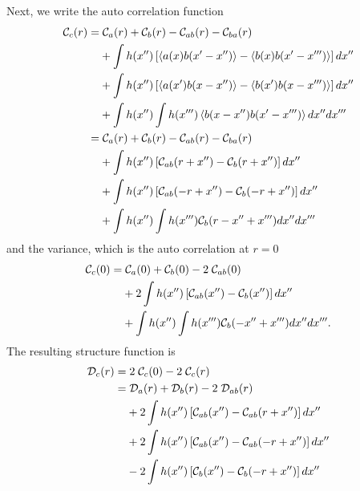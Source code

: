 \documentclass[11pt, oneside]{article}   	%
\begin{document}
\begin{appendix}
Next, we write the auto correlation function
\begin{align}
{\cal C}_c (r) =&\; {\cal C}_a (r) + {\cal C}_b (r) - {\cal C}_{a b}(r) - {\cal C}_{b a}(r) \nonumber \\
                       &+ \int h(x'') \left[\left< a(x) b(x'-x'')\right> - \left< b(x) b(x'-x''')\right> \right]dx'' \nonumber \\
                       &+ \int h(x'') \left[\left< a(x') b(x-x'')\right> - \left< b(x') b(x-x''')\right> \right]dx'' \nonumber \\
                       &+ \int h(x'') \int h(x''') \left< b(x-x'') b(x'-x''')\right> dx'' dx''' \nonumber \\
                      =&\;{\cal C}_a (r) + {\cal C}_b (r) - {\cal C}_{a b}(r) - {\cal C}_{ba}(r) \nonumber \\
                       &+\int h(x'') \left[ {\cal C}_{ab} (r+x'') - {\cal C}_b(r+x'') \right] dx'' \nonumber \\
                       &+\int h(x'') \left[ {\cal C}_{ab} (-r+x'') - {\cal C}_b(-r+x'') \right] dx'' \nonumber \\
                       &+\int h(x'') \int h(x''') {\cal C}_b(r-x''+x''') dx'' dx'''
\end{align}
and the variance, which is the auto correlation at $r=0$
\begin{align}
{\cal C}_c(0) = &\; {\cal C}_a(0) + {\cal C}_b (0) - 2\; {\cal C}_{a b}(0) \nonumber \\
                       &+2\int h(x'') \left[ {\cal C}_{ab} (x'') - {\cal C}_b(x'') \right] dx'' \nonumber \\
                       &+\int h(x'') \int h(x''') {\cal C}_b(-x''+x''') dx'' dx'''.
\end{align}
The resulting structure function is
\begin{align}
\label{eqn:67}
{\cal D}_c(r) =& \; 2\; {\cal C}_c (0) - 2\; {\cal C}_c(r) \nonumber \\
                     =&\; {\cal D}_a(r) + {\cal D}_b (r) - 2\; {\cal D}_{ab} (r) \nonumber \\
                       & + 2 \int h(x'') \left[ {\cal C}_{ab}(x'') - {\cal C}_{ab}(r+x'')\right] dx'' \nonumber \\
                       & + 2 \int h(x'') \left[ {\cal C}_{ab}(x'') - {\cal C}_{ab}(-r+x'')\right] dx'' \nonumber \\
                       & - 2 \int h(x'') \left[  {\cal C}_{b}(x'') - {\cal C}_b(-r+x'')\right] dx'' \nonumber \\

\end{align}
\end{appendix}
\end{document}
